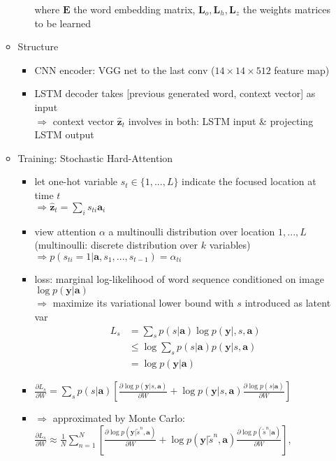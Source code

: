 \begin{itemize}
\begin{itemize}
\begin{itemize}
		where $\mathbf E$ the word embedding matrix, $\mathbf L_o, \mathbf L_h, \mathbf L_z$ the weights matrices to be learned 
		\end{itemize}
	\item Structure
		\begin{itemize}
		\item CNN encoder: VGG net to the last conv ($14\times14\times512$ feature map)
		\item LSTM decoder takes [previous generated word, context vector] as input \\
		$\Rightarrow$ context vector $\hat{\mathbf z}_t$ involves in both: LSTM input \& projecting LSTM output
		\end{itemize}
	\item Training: Stochastic Hard-Attention
		\begin{itemize}
		\item let one-hot variable $s_t\in\{1,...,L\}$ indicate the focused location at time $t$ \\
		$\Rightarrow \hat{\mathbf z}_t = \sum_{i} s_{ti}\mathbf a_i$ 
		\item view attention $\alpha$ a multinoulli distribution over location ${1,...,L}$ \\
		(multinoulli: discrete distribution over $k$ variables) \\
		$\Rightarrow p(s_{ti} = 1 | \mathbf a, s_1,...,s_{t-1}) = \alpha_{ti}$
 		\item loss: marginal log-likelihood of word sequence conditioned on image $\log p(\mathbf y | \mathbf a)$ \\
 		$\Rightarrow$ maximize its variational lower bound with $s$ introduced as latent var
 		\begin{align*} \displaystyle L_s &= \sum_s  p(s|\mathbf a) \log p(\mathbf y|,s,\mathbf a) \\
 		&\le \log \sum_s p(s|\mathbf a) p(\mathbf y|s,\mathbf a) \\ &= \log p(\mathbf y|\mathbf a) \end{align*}
		\item $\displaystyle \frac {\partial L_s} {\partial W} = \sum_s p(s|\mathbf a) \left[ \frac {\partial \log p(\mathbf y|s, \mathbf a)}{\partial W} + \log p(\mathbf y | s,\mathbf a) \frac {\partial \log p(s|\mathbf a)}{\partial W} \right]$
		\item $\Rightarrow$ approximated by Monte Carlo: \\
		$\displaystyle \frac{\partial L_s}{\partial W} \approx \frac 1 N \sum_{n=1}^N \left[ \frac {\partial \log p(\mathbf y|\tilde s^n, \mathbf a)}{\partial W} + \log p(\mathbf y | \tilde s^n,\mathbf a) \frac {\partial \log p(\tilde s^n|\mathbf a)}{\partial W} \right]$, \\

\end{itemize}
\end{itemize}
\end{itemize}
